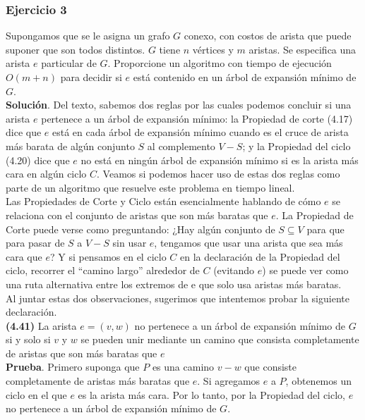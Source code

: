\documentclass[a4paper, 12pt]{book}
\theoremstyle{dotless}
\begin{document}
\subsubsection{Ejercicio 3}

Supongamos que se le asigna un grafo $G$ conexo, con costos de arista que puede suponer que son todos distintos. $G$ tiene $n$ vértices y $m$ aristas. Se especifica una arista $e$ particular de $G$. Proporcione un algoritmo con tiempo de ejecución $O(m+n)$ para decidir si $e$ está contenido en un árbol de expansión mínimo de $G$.\\

\textbf{Solución}. Del texto, sabemos dos reglas por las cuales podemos concluir si una arista $e$ pertenece a un árbol de expansión mínimo: la Propiedad de corte (4.17) dice que $e$ está en cada árbol de expansión mínimo cuando es el cruce de arista más barata de algún conjunto $S$ al complemento $V - S$; y la Propiedad del ciclo (4.20) dice que $e$ no está en ningún árbol de expansión mínimo si es la arista más cara en algún ciclo $C$. Veamos si podemos hacer uso de estas dos reglas como parte de un algoritmo que resuelve este problema en tiempo lineal.\\

Las Propiedades de Corte y Ciclo están esencialmente hablando de cómo $e$ se relaciona con el conjunto de aristas que son más baratas que $e$. La Propiedad de Corte puede verse como preguntando: ¿Hay algún conjunto de $S⊆V$ para que para pasar de $S$ a $V-S$ sin usar $e$, tengamos que usar una arista que sea más cara que $e$? Y si pensamos en el ciclo $C$ en la declaración de la Propiedad del ciclo, recorrer el ``camino largo'' alrededor de $C$ (evitando $e$) se puede ver como una ruta alternativa entre los extremos de e que solo usa aristas más baratas.\\

Al juntar estas dos observaciones, sugerimos que intentemos probar la siguiente declaración.\\

\textbf{(4.41)} La arista $e=(v,w)$ no pertenece a un árbol de expansión mínimo de $G$ si y solo si $v$ y $w$ se pueden unir mediante un camino que consista completamente de aristas que son más baratas que $e$\\

\textbf{Prueba}. Primero suponga que $P$ es una camino $v-w$ que consiste completamente de aristas más baratas que $e$. Si agregamos $e$ a $P$, obtenemos un ciclo en el que $e$ es la arista más cara. Por lo tanto, por la Propiedad del ciclo, $e$ no pertenece a un árbol de expansión mínimo de $G$.\\
\end{document}
